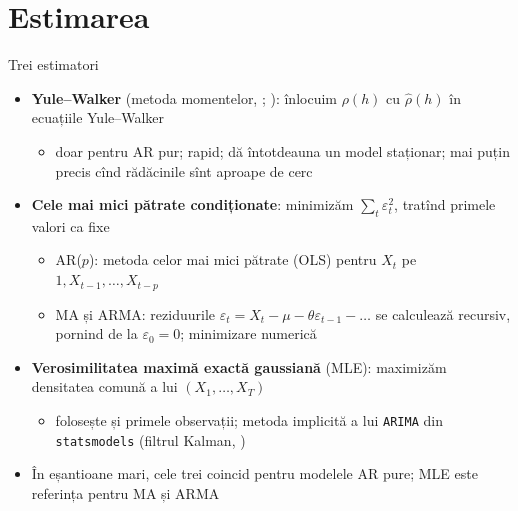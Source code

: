 \section{Estimarea}

\begin{frame}{Trei estimatori}
\itemsize{\small}
\begin{itemize}
    \item \textbf{Yule--Walker} (metoda momentelor, ; ): înlocuim $\rho(h)$ cu $\hat\rho(h)$ în ecuațiile Yule--Walker
    \begin{itemize}
        \item doar pentru AR pur; rapid; dă întotdeauna un model staționar; mai puțin precis cînd rădăcinile sînt aproape de cerc
    \end{itemize}
    \item \textbf{Cele mai mici pătrate condiționate}: minimizăm $\sum_t\varepsilon_t^2$, tratînd primele valori ca fixe
    \begin{itemize}
        \item AR($p$): metoda celor mai mici pătrate (OLS) pentru $X_t$ pe $1, X_{t-1}, \dots, X_{t-p}$
        \item MA și ARMA: reziduurile $\varepsilon_t = X_t - \mu - \theta\varepsilon_{t-1} - \dots$ se calculează recursiv, pornind de la $\varepsilon_0 = 0$; minimizare numerică
    \end{itemize}
    \item \textbf{Verosimilitatea maximă exactă gaussiană} (MLE): maximizăm densitatea comună a lui $(X_1, \dots, X_T)$
    \begin{itemize}
        \item folosește și primele observații; metoda implicită a lui \texttt{ARIMA} din \texttt{statsmodels} (filtrul Kalman, )
    \end{itemize}
    \item În eșantioane mari, cele trei coincid pentru modelele AR pure; MLE este referința pentru MA și ARMA
\end{itemize}
\end{frame}

